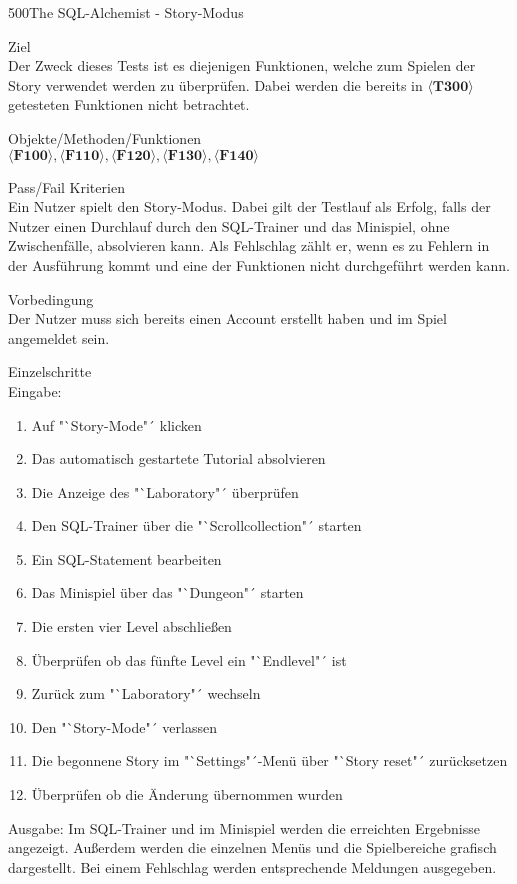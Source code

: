 \begin{testcase}{500}{The SQL-Alchemist - Story-Modus}

\item[Ziel]~\\
Der Zweck dieses Tests ist es diejenigen Funktionen, welche zum Spielen der Story verwendet werden zu überprüfen. Dabei werden die bereits in $\langle\textbf{T300}\rangle$ getesteten Funktionen nicht betrachtet.

\item[Objekte/Methoden/Funktionen]~\\
$\langle\textbf{F100}\rangle, \langle\textbf{F110}\rangle, \langle\textbf{F120}\rangle, \langle\textbf{F130}\rangle, \langle\textbf{F140}\rangle$ 

\item[Pass/Fail Kriterien]~\\
Ein Nutzer spielt den Story-Modus. Dabei gilt der Testlauf als Erfolg, falls der Nutzer einen Durchlauf durch den SQL-Trainer und das Minispiel, ohne Zwischenfälle, absolvieren kann. Als Fehlschlag zählt er, wenn es zu Fehlern in der Ausführung kommt und eine der Funktionen nicht durchgeführt werden kann. 

\item[Vorbedingung]~\\
Der Nutzer muss sich bereits einen Account erstellt haben und im Spiel angemeldet sein.

\item[Einzelschritte]~\\

Eingabe:
\begin{enumerate}
\item Auf "`Story-Mode"´ klicken
\item Das automatisch gestartete Tutorial absolvieren
\item Die Anzeige des "`Laboratory"´ überprüfen
\item Den SQL-Trainer über die "`Scrollcollection"´ starten
\item Ein SQL-Statement bearbeiten
\item Das Minispiel über das "`Dungeon"´ starten
\item Die ersten vier Level abschließen
\item Überprüfen ob das fünfte Level ein "`Endlevel"´ ist
\item Zurück zum "`Laboratory"´ wechseln
\item Den "`Story-Mode"´ verlassen
\item Die begonnene Story im "`Settings"´-Menü über "`Story reset"´ zurücksetzen 
\item Überprüfen ob die Änderung übernommen wurden
\end{enumerate}
Ausgabe:
Im SQL-Trainer und im Minispiel werden die erreichten Ergebnisse angezeigt. Außerdem werden die einzelnen Menüs und die Spielbereiche grafisch dargestellt. Bei einem Fehlschlag werden entsprechende Meldungen ausgegeben.


\end{testcase}
